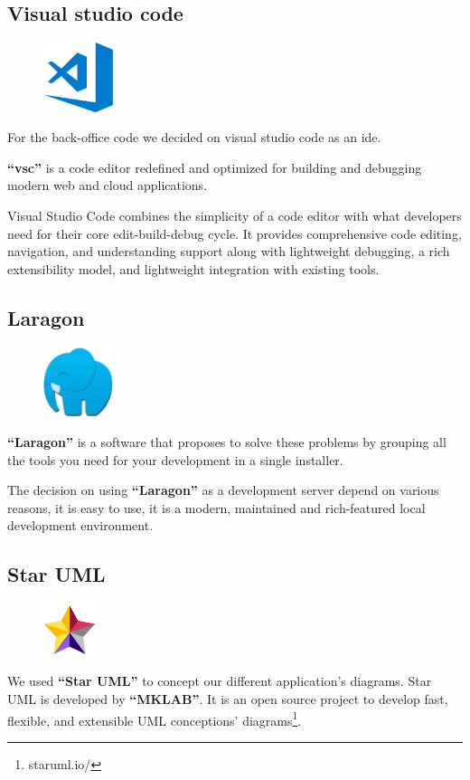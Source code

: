 \documentclass[12pt,a4paper]{report}
\begin{document}
	\subsection{Visual studio code}
	\begin{figure}
		\centering
		\includegraphics[width=0.8in]{vsc-logo.png}	
		
	\end{figure}
	For the back-office code we decided on visual studio code as an \ac{ide}.\par 
	\textbf{``\ac{vsc}''} is a code editor redefined and optimized for building and debugging modern web and cloud applications.\par 
	Visual Studio Code combines the simplicity of a code editor with what developers need for their core edit-build-debug cycle. It provides comprehensive code editing, navigation, and understanding support along with lightweight debugging, a rich extensibility model, and lightweight integration with existing tools.
	\subsection{Laragon}
	\begin{figure}
		\centering
		\includegraphics[width=0.8in]{laragonlogo.png}	
		
	\end{figure}
	\textbf{``Laragon''} is a software that proposes to solve these problems by grouping all the tools you need for your development in a single installer.\par 
	The decision on using \textbf{``Laragon''} as a development server depend on various reasons, it is easy to use, it is  a modern, maintained and rich-featured local development environment.

	\subsection{Star UML}
	\begin{figure}
		\centering
		\includegraphics[width=0.6in]{staruml.png}
	\end{figure}
	We used \textbf{``Star UML''} to concept our different application's diagrams. Star UML is developed by \textbf{``MKLAB''}. It is an open source project to develop fast, flexible, and extensible UML conceptions' diagrams\footnote{staruml.io/}.\\
	\clearpage
\end{document}
